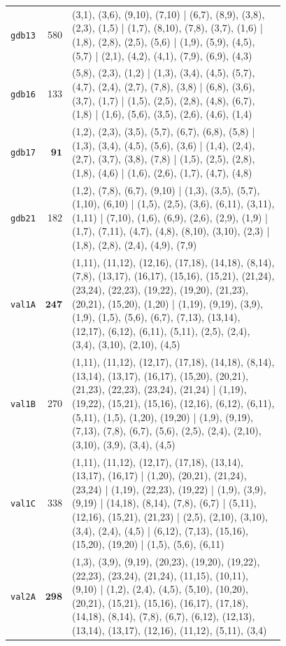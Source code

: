 \begin{landscape}
\begin{longtable}{lr>{\tiny\raggedright\arraybackslash}p{0.78\linewidth}}
\texttt{gdb13} & 580 & (3,1), (3,6), (9,10), (7,10) | (6,7), (8,9), (3,8), (2,3), (1,5) | (1,7), (8,10), (7,8), (3,7), (1,6) | (1,8), (2,8), (2,5), (5,6) | (1,9), (5,9), (4,5), (5,7) | (2,1), (4,2), (4,1), (7,9), (6,9), (4,3) \\[2pt]
\texttt{gdb16} & 133 & (5,8), (2,3), (1,2) | (1,3), (3,4), (4,5), (5,7), (4,7), (2,4), (2,7), (7,8), (3,8) | (6,8), (3,6), (3,7), (1,7) | (1,5), (2,5), (2,8), (4,8), (6,7), (1,8) | (1,6), (5,6), (3,5), (2,6), (4,6), (1,4) \\[2pt]
\texttt{gdb17} & $\mathbf{91}$ & (1,2), (2,3), (3,5), (5,7), (6,7), (6,8), (5,8) | (1,3), (3,4), (4,5), (5,6), (3,6) | (1,4), (2,4), (2,7), (3,7), (3,8), (7,8) | (1,5), (2,5), (2,8), (1,8), (4,6) | (1,6), (2,6), (1,7), (4,7), (4,8) \\[2pt]
\texttt{gdb21} & 182 & (1,2), (7,8), (6,7), (9,10) | (1,3), (3,5), (5,7), (1,10), (6,10) | (1,5), (2,5), (3,6), (6,11), (3,11), (1,11) | (7,10), (1,6), (6,9), (2,6), (2,9), (1,9) | (1,7), (7,11), (4,7), (4,8), (8,10), (3,10), (2,3) | (1,8), (2,8), (2,4), (4,9), (7,9) \\[2pt]
\texttt{val1A} & $\mathbf{247}$ & (1,11), (11,12), (12,16), (17,18), (14,18), (8,14), (7,8), (13,17), (16,17), (15,16), (15,21), (21,24), (23,24), (22,23), (19,22), (19,20), (21,23), (20,21), (15,20), (1,20) | (1,19), (9,19), (3,9), (1,9), (1,5), (5,6), (6,7), (7,13), (13,14), (12,17), (6,12), (6,11), (5,11), (2,5), (2,4), (3,4), (3,10), (2,10), (4,5) \\[2pt]
\texttt{val1B} & 270 & (1,11), (11,12), (12,17), (17,18), (14,18), (8,14), (13,14), (13,17), (16,17), (15,20), (20,21), (21,23), (22,23), (23,24), (21,24) | (1,19), (19,22), (15,21), (15,16), (12,16), (6,12), (6,11), (5,11), (1,5), (1,20), (19,20) | (1,9), (9,19), (7,13), (7,8), (6,7), (5,6), (2,5), (2,4), (2,10), (3,10), (3,9), (3,4), (4,5) \\[2pt]
\texttt{val1C} & 338 & (1,11), (11,12), (12,17), (17,18), (13,14), (13,17), (16,17) | (1,20), (20,21), (21,24), (23,24) | (1,19), (22,23), (19,22) | (1,9), (3,9), (9,19) | (14,18), (8,14), (7,8), (6,7) | (5,11), (12,16), (15,21), (21,23) | (2,5), (2,10), (3,10), (3,4), (2,4), (4,5) | (6,12), (7,13), (15,16), (15,20), (19,20) | (1,5), (5,6), (6,11) \\[2pt]
\texttt{val2A} & $\mathbf{298}$ & (1,3), (3,9), (9,19), (20,23), (19,20), (19,22), (22,23), (23,24), (21,24), (11,15), (10,11), (9,10) | (1,2), (2,4), (4,5), (5,10), (10,20), (20,21), (15,21), (15,16), (16,17), (17,18), (14,18), (8,14), (7,8), (6,7), (6,12), (12,13), (13,14), (13,17), (12,16), (11,12), (5,11), (3,4) \\[2pt]

\end{longtable}
\end{landscape}
